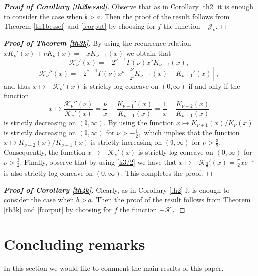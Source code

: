 \documentclass[10pt]{amsart}
\begin{document}
\begin{proof}[\bf Proof of Corollary \ref{th2bessel}] Observe that as in Corollary \ref{th2} it is enough to consider the case when $b>a.$ Then the proof of the result follows from Theorem \ref{th1bessel} and \eqref{fcorput} by choosing for $f$ the function $-\mathcal{J}_{\nu}.$
\end{proof}

\begin{proof}[\bf Proof of Theorem \ref{th3k}]
By using the recurrence relation \cite[p. 79]{watson} $xK_{\nu}'(x)+\nu K_{\nu}(x)=-xK_{\nu-1}(x)$ we obtain that
$$\mathcal{K}_{\nu}'(x)=-2^{\nu-1}\Gamma(\nu)x^{\nu}K_{\nu-1}(x),$$
$$\mathcal{K}_{\nu}''(x)=-2^{\nu-1}\Gamma(\nu)x^{\nu}\left[\frac{\nu}{x}K_{\nu-1}(x)+K_{\nu-1}'(x)\right],$$
and thus $x\mapsto -\mathcal{K}_{\nu}'(x)$ is strictly log-concave on $(0,\infty)$ if and only if the function
$$x\mapsto \frac{\mathcal{K}_{\nu}''(x)}{\mathcal{K}_{\nu}'(x)}=\frac{\nu}{x}+\frac{K_{\nu-1}'(x)}{K_{\nu-1}(x)}=\frac{1}{x}-\frac{K_{\nu-2}(x)}{K_{\nu-1}(x)}$$
is strictly decreasing on $(0,\infty).$ By using \cite[Lemma 2.4]{im} the function $x\mapsto K_{\nu+1}(x)/K_{\nu}(x)$ is strictly decreasing on $(0,\infty)$ for $\nu>-\frac{1}{2},$ which implies that the function $x\mapsto {K_{\nu-2}(x)}/{K_{\nu-1}(x)}$ is strictly increasing on $(0,\infty)$ for $\nu>\frac{3}{2}.$ Consequently, the function $x\mapsto -\mathcal{K}_{\nu}'(x)$ is strictly log-concave on $(0,\infty)$ for $\nu>\frac{3}{2}.$ Finally, observe that by using \eqref{k3/2} we have that $x\mapsto -\mathcal{K}_{\frac{3}{2}}'(x)=\frac{\pi}{2}xe^{-x}$ is also strictly log-concave on $(0,\infty).$ This completes the proof.
\end{proof}

\begin{proof}[\bf Proof of Corollary \ref{th4k}]
Clearly, as in Corollary \ref{th2} it is enough to consider the case when $b>a.$ Then the proof of the result follows from Theorem \ref{th3k} and \eqref{fcorput} by choosing for $f$ the function $-\mathcal{K}_{\nu}.$
\end{proof}

\section{\bf Concluding remarks}
\setcounter{equation}{0}

In this section we would like to comment the main results of this paper.
\end{document}
